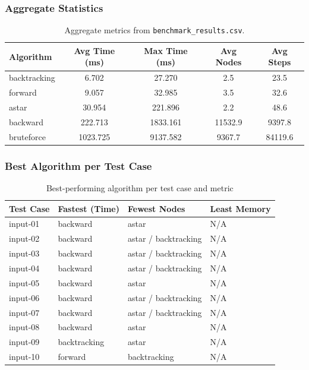 \documentclass[12pt,a4paper]{article}
\begin{document}
\subsubsection{Aggregate Statistics}
\begin{table}[H]
\centering
\renewcommand{\arraystretch}{1.3}
\begin{tabular}{|l|c|c|c|c|}
\hline
\textbf{Algorithm} & \textbf{Avg Time (ms)} & \textbf{Max Time (ms)} & \textbf{Avg Nodes} & \textbf{Avg Steps} \\
\hline
backtracking & 6.702 & 27.270 & 2.5 & 23.5 \\
forward & 9.057 & 32.985 & 3.5 & 32.6 \\
astar & 30.954 & 221.896 & 2.2 & 48.6 \\
backward & 222.713 & 1833.161 & 11532.9 & 9397.8 \\
bruteforce & 1023.725 & 9137.582 & 9367.7 & 84119.6 \\
\hline
\end{tabular}
\caption{Aggregate metrics from \texttt{benchmark\_results.csv}.}
\end{table}

\subsubsection{Best Algorithm per Test Case}
\begin{table}[H]
\centering
\renewcommand{\arraystretch}{1.2}
\begin{tabular}{|l|l|l|l|}
\hline
\textbf{Test Case} & \textbf{Fastest (Time)} & \textbf{Fewest Nodes} & \textbf{Least Memory} \\
\hline
input-01 & backward & astar & N/A \\
input-02 & backward & astar / backtracking & N/A \\
input-03 & backward & astar / backtracking & N/A \\
input-04 & backward & astar / backtracking & N/A \\
input-05 & backward & astar & N/A \\
input-06 & backward & astar / backtracking & N/A \\
input-07 & backward & astar / backtracking & N/A \\
input-08 & backward & astar & N/A \\
input-09 & backtracking & astar & N/A \\
input-10 & forward & backtracking & N/A \\
\hline
\end{tabular}
\caption{Best-performing algorithm per test case and metric}
\end{table}
\end{document}
